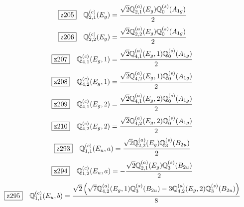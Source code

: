 \documentclass[fleqn,10pt,landscape]{jsarticle}
\begin{document}
\begin{dmath*}
\hspace*{3mm}\fbox{z205}\quad \mathbb{Q}_{2,1}^{(c)}(E_{g})=\frac{\sqrt{2} \mathbb{Q}_{2,1}^{(a)}(E_{g}) \mathbb{Q}_{0}^{(s)}(A_{1g})}{2}
\end{dmath*}
\begin{dmath*}
\hspace*{3mm}\fbox{z206}\quad \mathbb{Q}_{2,2}^{(c)}(E_{g})=\frac{\sqrt{2} \mathbb{Q}_{2,2}^{(a)}(E_{g}) \mathbb{Q}_{0}^{(s)}(A_{1g})}{2}
\end{dmath*}
\begin{dmath*}
\hspace*{3mm}\fbox{z207}\quad \mathbb{Q}_{4,1}^{(c)}(E_{g},1)=\frac{\sqrt{2} \mathbb{Q}_{4,1}^{(a)}(E_{g},1) \mathbb{Q}_{0}^{(s)}(A_{1g})}{2}
\end{dmath*}
\begin{dmath*}
\hspace*{3mm}\fbox{z208}\quad \mathbb{Q}_{4,2}^{(c)}(E_{g},1)=\frac{\sqrt{2} \mathbb{Q}_{4,2}^{(a)}(E_{g},1) \mathbb{Q}_{0}^{(s)}(A_{1g})}{2}
\end{dmath*}
\begin{dmath*}
\hspace*{3mm}\fbox{z209}\quad \mathbb{Q}_{4,1}^{(c)}(E_{g},2)=\frac{\sqrt{2} \mathbb{Q}_{4,1}^{(a)}(E_{g},2) \mathbb{Q}_{0}^{(s)}(A_{1g})}{2}
\end{dmath*}
\begin{dmath*}
\hspace*{3mm}\fbox{z210}\quad \mathbb{Q}_{4,2}^{(c)}(E_{g},2)=\frac{\sqrt{2} \mathbb{Q}_{4,2}^{(a)}(E_{g},2) \mathbb{Q}_{0}^{(s)}(A_{1g})}{2}
\end{dmath*}
\begin{dmath*}
\hspace*{3mm}\fbox{z293}\quad \mathbb{Q}_{1,1}^{(c)}(E_{u},a)=\frac{\sqrt{2} \mathbb{Q}_{2,2}^{(a)}(E_{g}) \mathbb{Q}_{3}^{(s)}(B_{2u})}{2}
\end{dmath*}
\begin{dmath*}
\hspace*{3mm}\fbox{z294}\quad \mathbb{Q}_{1,2}^{(c)}(E_{u},a)=- \frac{\sqrt{2} \mathbb{Q}_{2,1}^{(a)}(E_{g}) \mathbb{Q}_{3}^{(s)}(B_{2u})}{2}
\end{dmath*}
\begin{dmath*}
\hspace*{3mm}\fbox{z295}\quad \mathbb{Q}_{1,1}^{(c)}(E_{u},b)=\frac{\sqrt{2} \left(\sqrt{7} \mathbb{Q}_{4,2}^{(a)}(E_{g},1) \mathbb{Q}_{3}^{(s)}(B_{2u}) - 3 \mathbb{Q}_{4,2}^{(a)}(E_{g},2) \mathbb{Q}_{3}^{(s)}(B_{2u})\right)}{8}
\end{dmath*}
\end{document}
